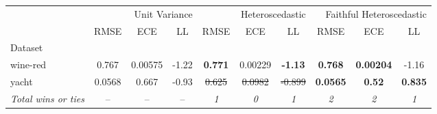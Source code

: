 \begin{tabular}{l|ccc|ccc|ccc}
\toprule
{} & \multicolumn{3}{r}{Unit Variance} & \multicolumn{3}{r}{Heteroscedastic} & \multicolumn{3}{r}{Faithful Heteroscedastic} \\
{} & {RMSE} & {ECE} & {LL} & {RMSE} & {ECE} & {LL} & {RMSE} & {ECE} & {LL} \\
{Dataset} & {} & {} & {} & {} & {} & {} & {} & {} & {} \\
\midrule
wine-red & 0.767 & 0.00575 & -1.22 & \textbf{0.771} & 0.00229 & \textbf{-1.13} & \textbf{0.768} & \textbf{0.00204} & -1.16 \\
yacht & 0.0568 & 0.667 & -0.93 & \sout{0.625} & \sout{0.0982} & \sout{-0.899} & \textbf{0.0565} & \textbf{0.52} & \textbf{0.835} \\
\textit{{Total wins or ties}} & -- & -- & -- & \textit{1} & \textit{0} & \textit{1} & \textit{2} & \textit{2} & \textit{1} \\
\bottomrule
\end{tabular}

